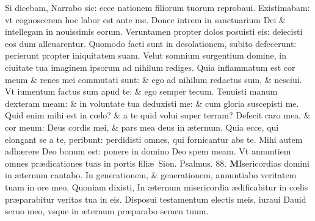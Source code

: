 \documentclass[a5paper,10pt]{book}
\def\ae{æ}
\def\oe{œ}
\begin{document}
\begin{multicols*}{2}
\newline \color{red} S\color{black}i dicebam, Narrabo sic: ecce nationem filiorum tuorum reprobaui.
\newline \color{red} E\color{black}xistimabam: vt cognoscerem hoc labor est ante me.
\newline \color{red} D\color{black}onec intrem in sanctuarium Dei \& intellegam in nouissimis eorum.
\newline \color{red} V\color{black}eruntamen propter dolos posuisti eis: deiecisti eos dum alleuarentur.
\newline \color{red} Q\color{black}uomodo facti sunt in desolationem, subito defecerunt: perierunt propter iniquitatem suam.
\newline \color{red} V\color{black}elut somnium surgentium domine, in ciuitate tua imaginem ipsorum ad nihilum rediges.
\newline \color{red} Q\color{black}uia inflammatum est cor meum \& renes mei commutati sunt: \& ego ad nihilum redactus sum, \& nesciui.
\newline \color{red} V\color{black}t iumentum factus sum apud te: \& ego semper tecum.
\newline \color{red} T\color{black}enuisti manum dexteram meam: \& in voluntate tua deduxisti me: \& cum gloria suscepisti me.
\newline \color{red} Q\color{black}uid enim mihi est in c\oe lo? \& a te quid volui super terram?
\newline \color{red} D\color{black}efecit caro mea, \& cor meum: Deus cordis mei, \& pars mea deus in \ae ternum.
\newline \color{red} Q\color{black}uia ecce, qui elongant se a te, peribunt: perdidisti omnes, qui fornicantur abs te.
\newline \color{red} M\color{black}ihi autem adh\ae rere Deo bonum est: ponere in domino Deo spem meam.
\newline \color{red} V\color{black}t annuntiem omnes pr\ae dicationes tuas in portis fili\ae \ Sion. \color{red} Psalmus. 88. \color{black}
\vspace{-1em}
\lettrine[lines=2]{\bfseries \color{red} M}{}Isericordias domini in \ae ternum cantabo.
\newline \color{red} I\color{black}n generationem, \& generationem, annuntiabo veritatem tuam in ore meo.
\newline \color{red} Q\color{black}uoniam dixisti, In \ae ternum misericordia \ae dificabitur in c\oe lis pr\ae parabitur veritas tua in eis.
\newline \color{red} D\color{black}isposui testamentum electis meis, iuraui Dauid seruo meo, vsque in \ae ternum pr\ae parabo semen tuum.

\end{multicols*}
\end{document}
